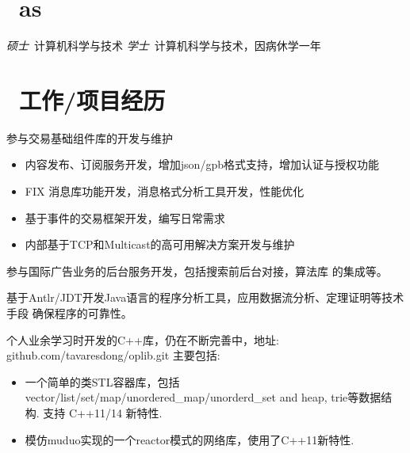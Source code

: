 \documentclass{resume}
\begin{document}



\section{\faGraduationCap\ as}
\textit{硕士}\ 计算机科学与技术
\textit{学士}\ 计算机科学与技术，因病休学一年

\section{\faUsers\ 工作/项目经历}
参与交易基础组件库的开发与维护
\begin{itemize}
  \item 内容发布、订阅服务开发，增加json/gpb格式支持，增加认证与授权功能
  \item FIX 消息库功能开发，消息格式分析工具开发，性能优化
  \item 基于事件的交易框架开发，编写日常需求
  \item 内部基于TCP和Multicast的高可用解决方案开发与维护
\end{itemize}

参与国际广告业务的后台服务开发，包括搜索前后台对接，算法库
的集成等。

基于Antlr/JDT开发Java语言的程序分析工具，应用数据流分析、定理证明等技术手段
确保程序的可靠性。

个人业余学习时开发的C++库，仍在不断完善中，地址:
github.com/tavaresdong/oplib.git
主要包括:
\begin{itemize}
  \item 一个简单的类STL容器库，包括 vector/list/set/map/unordered\_map/unorderd\_set and heap, trie等数据结构. 支持 C++11/14 新特性.
  \item 模仿muduo实现的一个reactor模式的网络库，使用了C++11新特性.
\end{itemize}
\end{document}
